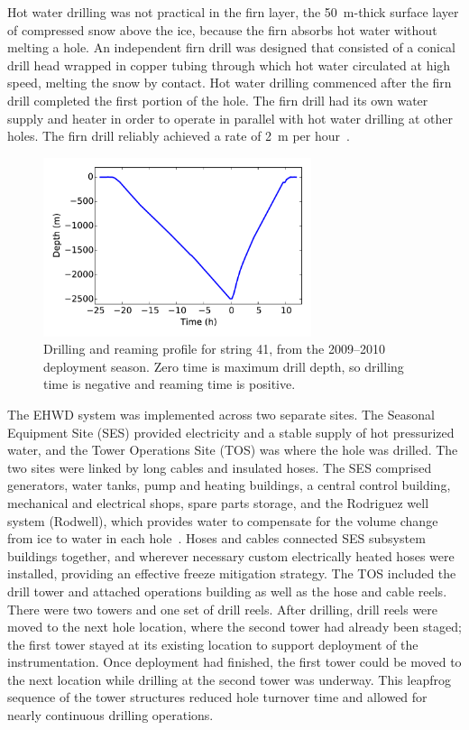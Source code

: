 Hot water drilling was not practical in the firn layer, the 50~m-thick surface layer of
compressed snow above the ice, because the firn
absorbs hot water without melting a hole.  An independent
firn drill was designed that consisted of a conical drill
head wrapped in copper tubing through which hot water circulated at high speed,
melting the snow by contact. Hot water drilling commenced after the firn
drill completed the first portion of the hole. The firn drill had its own
water supply and heater in order to operate in parallel with hot water drilling
at other holes. The firn drill reliably achieved a rate of 2~m per hour~\cite{ehwd}.

\begin{figure}[!ht]
 \centering
 \includegraphics[width=0.7\textwidth]{graphics/drill/drill_depth_hole41.pdf}
\caption{Drilling and reaming profile for string 41, from the 2009--2010
  deployment season. Zero time is maximum drill depth, so drilling time is
  negative and reaming time is positive.}
\label{fig:drilldepthtime}
\end{figure}

The EHWD system was implemented across two separate sites. The Seasonal
Equipment Site (SES) provided electricity and a stable supply of hot
pressurized water, and the Tower Operations Site (TOS) was where the hole
was drilled.  The two sites were linked by long cables and insulated
hoses. The SES comprised generators, water tanks, pump and heating
buildings, a central control building, mechanical and electrical shops,
spare parts storage, and the Rodriguez well system (Rodwell), which
provides water to compensate for the volume change from ice to water
in each hole~\cite{rodriguez_well}. Hoses and cables connected SES subsystem buildings together, and
wherever necessary custom electrically heated hoses were installed,
providing an effective freeze mitigation strategy. The TOS included the
drill tower and attached operations building as well as the hose and cable
reels.  There were two towers and one set of drill reels.  After drilling,
drill reels were moved to the next hole location, where the second tower
had already been staged; the first tower stayed at its existing location
to support deployment of the instrumentation.  Once deployment had
finished, the first tower could be moved to the next location while
drilling at the second tower was underway.  This leapfrog sequence of the
tower structures reduced hole turnover time and allowed for nearly
continuous drilling operations.

